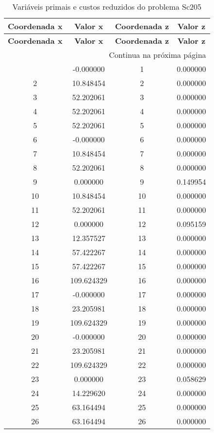 \documentclass[12pt]{article}
\begin{document}
\begin{longtable}{@{}cccc@{}}
\caption{Variáveis primais e custos reduzidos do problema Sc205} \\
\toprule
\textbf{Coordenada x} & \textbf{Valor x} & \textbf{Coordenada z} & \textbf{Valor z} \\
\midrule
\endfirsthead

\toprule
\textbf{Coordenada x} & \textbf{Valor x} & \textbf{Coordenada z} & \textbf{Valor z} \\
\midrule
\endhead

\midrule \multicolumn{4}{r}{{Continua na próxima página}} \\ \midrule
\endfoot

\bottomrule
\endlastfoot
1 & -0.000000 & 1 & 0.000000 \\
2 & 10.848454 & 2 & 0.000000 \\
3 & 52.202061 & 3 & 0.000000 \\
4 & 52.202061 & 4 & 0.000000 \\
5 & 52.202061 & 5 & 0.000000 \\
6 & -0.000000 & 6 & 0.000000 \\
7 & 10.848454 & 7 & 0.000000 \\
8 & 52.202061 & 8 & 0.000000 \\
9 & 0.000000 & 9 & 0.149954 \\
10 & 10.848454 & 10 & 0.000000 \\
11 & 52.202061 & 11 & 0.000000 \\
12 & 0.000000 & 12 & 0.095159 \\
13 & 12.357527 & 13 & 0.000000 \\
14 & 57.422267 & 14 & 0.000000 \\
15 & 57.422267 & 15 & 0.000000 \\
16 & 109.624329 & 16 & 0.000000 \\
17 & -0.000000 & 17 & 0.000000 \\
18 & 23.205981 & 18 & 0.000000 \\
19 & 109.624329 & 19 & 0.000000 \\
20 & -0.000000 & 20 & 0.000000 \\
21 & 23.205981 & 21 & 0.000000 \\
22 & 109.624329 & 22 & 0.000000 \\
23 & 0.000000 & 23 & 0.058629 \\
24 & 14.229620 & 24 & 0.000000 \\
25 & 63.164494 & 25 & 0.000000 \\
26 & 63.164494 & 26 & 0.000000 \\

\end{longtable}
\end{document}
